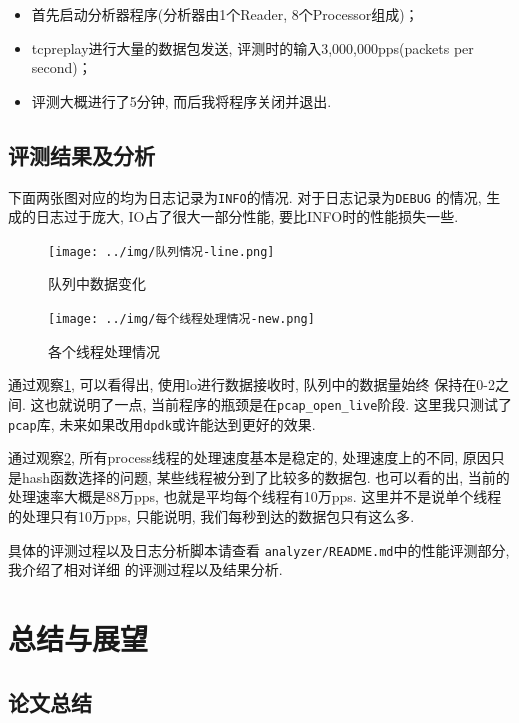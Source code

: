 \begin{itemize}
    \item 首先启动分析器程序(分析器由1个Reader, 8个Processor组成)；
    \item tcpreplay进行大量的数据包发送, 评测时的输入3,000,000pps(packets per second)；
    \item 评测大概进行了5分钟, 而后我将程序关闭并退出.
\end{itemize}

\section{评测结果及分析}

 下面两张图对应的均为日志记录为\texttt{INFO}的情况. 对于日志记录为\texttt{DEBUG}
的情况, 生成的日志过于庞大, IO占了很大一部分性能, 要比INFO时的性能损失一些.

\begin{figure}[htbp!]
  \centering
  \texttt{[image: ../img/队列情况-line.png]}
  \caption{队列中数据变化}
  \label{fig:queue_pic}
\end{figure}

\begin{figure}[htbp!]
  \centering
  \texttt{[image: ../img/每个线程处理情况-new.png]}
  \caption{各个线程处理情况}
  \label{fig:process_pic}
\end{figure}


通过观察\ref{fig:queue_pic}, 可以看得出, 使用lo进行数据接收时, 队列中的数据量始终
保持在0-2之间. 这也就说明了一点, 当前程序的瓶颈是在\texttt{pcap\_open\_live}阶段.
这里我只测试了\texttt{pcap}库, 未来如果改用\texttt{dpdk}或许能达到更好的效果.

通过观察\ref{fig:process_pic}, 所有process线程的处理速度基本是稳定的,
处理速度上的不同, 原因只是hash函数选择的问题, 某些线程被分到了比较多的数据包.
也可以看的出, 当前的处理速率大概是88万pps, 也就是平均每个线程有10万pps.
这里并不是说单个线程的处理只有10万pps, 只能说明, 我们每秒到达的数据包只有这么多.

具体的评测过程以及日志分析脚本请查看
\texttt{analyzer/README.md}\cite{Niftyflow}中的性能评测部分,我介绍了相对详细
的评测过程以及结果分析.

\chapter{总结与展望}

\section{论文总结}

